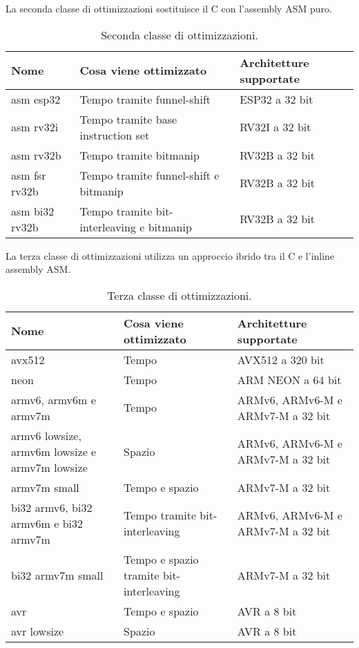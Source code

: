 \noindent La seconda classe di ottimizzazioni sostituisce il C con l'assembly ASM puro\cite{github}.

\begin{table}[H]
    \centering
	\begin{tabular}{|m{}<{\centering}||m{}<{\centering}|m{}<{\centering}|}
		\hline
		\textbf{Nome} & \textbf{Cosa viene ottimizzato} & \textbf{Architetture supportate} \\
        \hline \hline
        asm esp32 & Tempo tramite funnel-shift & ESP32 a 32 bit \\
        \hline
        asm rv32i & Tempo tramite base instruction set & RV32I a 32 bit \\
        \hline
        asm rv32b & Tempo tramite bitmanip & RV32B a 32 bit \\
        \hline
        asm fsr rv32b & Tempo tramite funnel-shift e bitmanip & RV32B a 32 bit \\
        \hline
        asm bi32 rv32b & Tempo tramite bit-interleaving e bitmanip & RV32B a 32 bit \\
        \hline
    \end{tabular}
    \caption{Seconda classe di ottimizzazioni.}
\end{table}

\noindent La terza classe di ottimizzazioni utilizza un approccio ibrido tra il C e l'inline assembly ASM\cite{github}.

\begin{table}[H]
    \centering
	\begin{tabular}{|m{}<{\centering}||m{}<{\centering}|m{}<{\centering}|}
		\hline
		\textbf{Nome} & \textbf{Cosa viene ottimizzato} & \textbf{Architetture supportate} \\
        \hline \hline
        avx512 & Tempo & AVX512 a 320 bit \\
        \hline
        neon & Tempo & ARM NEON a 64 bit \\
        \hline
        armv6, armv6m e armv7m & Tempo & ARMv6, ARMv6-M e ARMv7-M a 32 bit \\
        \hline
        armv6 lowsize, armv6m lowsize e armv7m lowsize & Spazio & ARMv6, ARMv6-M e ARMv7-M a 32 bit \\
        \hline
        armv7m small & Tempo e spazio & ARMv7-M a 32 bit \\
        \hline
        bi32 armv6, bi32 armv6m e bi32 armv7m & Tempo tramite bit-interleaving & ARMv6, ARMv6-M e ARMv7-M a 32 bit \\
        \hline
        bi32 armv7m small & Tempo e spazio tramite bit-interleaving & ARMv7-M a 32 bit \\
        \hline
        avr & Tempo e spazio & AVR a 8 bit \\
        \hline
        avr lowsize & Spazio & AVR a 8 bit \\
        \hline
    \end{tabular}
    \caption{Terza classe di ottimizzazioni.}
\end{table}

